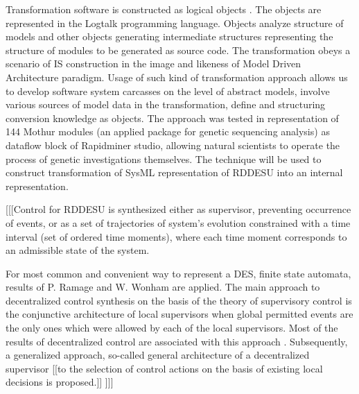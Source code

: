 \documentclass[runningheads]{llncs}
\begin{document}
Transformation software is constructed as logical objects \cite{b3}. The objects are represented in the Logtalk programming language. Objects analyze structure of models and other objects generating intermediate structures representing the structure of modules to be generated as source code. The transformation obeys a scenario of IS construction in the image and likeness of Model Driven Architecture paradigm. Usage of such kind of transformation approach allows us to develop software system carcasses on the level of abstract models, involve various sources of model data in the transformation, define and structuring conversion knowledge as objects. The approach was tested in representation of 144 Mothur modules (an applied package for genetic sequencing analysis) as dataflow block of Rapidminer studio, allowing natural scientists to operate the process of genetic investigations themselves. The technique will be used to construct transformation of SysML representation of RDDESU into an internal representation.


[[[Control for RDDESU is synthesized either as supervisor, preventing occurrence of events, or as a set of trajectories of system’s evolution constrained with a time interval (set of ordered time moments), where each time moment corresponds to an admissible state of the system.

For most common and convenient way to represent a DES, finite state automata, results of P. Ramage and W. Wonham \cite{whoam} are applied. The main approach to decentralized control synthesis on the basis of the theory of supervisory control is the conjunctive architecture of local supervisors when global permitted events are the only ones which were allowed by each of the local supervisors. Most of the results of decentralized control are associated with this approach \cite{whoam}. Subsequently, a generalized approach, so-called general architecture of a decentralized supervisor \cite{tsyoo} [[to the selection of control actions on the basis of existing local decisions is proposed.]] ]]]
\end{document}
